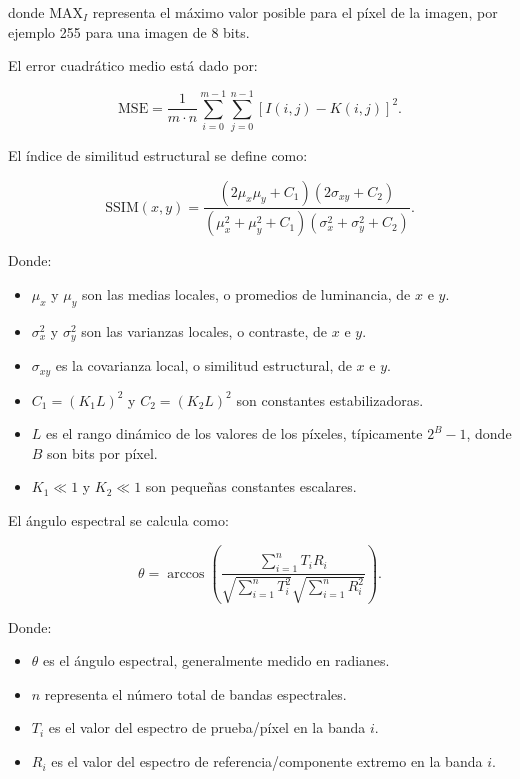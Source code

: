 \documentclass[12pt]{article}
\begin{document}
donde $\mathrm{MAX}_I$ representa el máximo valor posible para el píxel de la imagen, por ejemplo 255 para una imagen de 8 bits.

El error cuadrático medio está dado por:

\begin{equation}
\mathrm{MSE} =
\frac{1}{m \cdot n}
\sum_{i=0}^{m-1}
\sum_{j=0}^{n-1}
\left[I(i,j)-K(i,j)\right]^2.
\end{equation}

El índice de similitud estructural se define como:

\begin{equation}
\mathrm{SSIM}(x,y) =
\frac{(2\mu_x\mu_y + C_1)(2\sigma_{xy} + C_2)}
{(\mu_x^2 + \mu_y^2 + C_1)(\sigma_x^2 + \sigma_y^2 + C_2)}.
\end{equation}

Donde:

\begin{itemize}
    \item $\mu_x$ y $\mu_y$ son las medias locales, o promedios de luminancia, de $x$ e $y$.
    \item $\sigma_x^2$ y $\sigma_y^2$ son las varianzas locales, o contraste, de $x$ e $y$.
    \item $\sigma_{xy}$ es la covarianza local, o similitud estructural, de $x$ e $y$.
    \item $C_1 = (K_1L)^2$ y $C_2 = (K_2L)^2$ son constantes estabilizadoras.
    \item $L$ es el rango dinámico de los valores de los píxeles, típicamente $2^B - 1$, donde $B$ son bits por píxel.
    \item $K_1 \ll 1$ y $K_2 \ll 1$ son pequeñas constantes escalares.
\end{itemize}

El ángulo espectral se calcula como:

\begin{equation}
\theta =
\arccos
\left(
\frac{\sum_{i=1}^{n} T_iR_i}
{\sqrt{\sum_{i=1}^{n} T_i^2}\sqrt{\sum_{i=1}^{n} R_i^2}}
\right).
\end{equation}

Donde:

\begin{itemize}
    \item $\theta$ es el ángulo espectral, generalmente medido en radianes.
    \item $n$ representa el número total de bandas espectrales.
    \item $T_i$ es el valor del espectro de prueba/píxel en la banda $i$.
    \item $R_i$ es el valor del espectro de referencia/componente extremo en la banda $i$.
\end{itemize}
\end{document}
